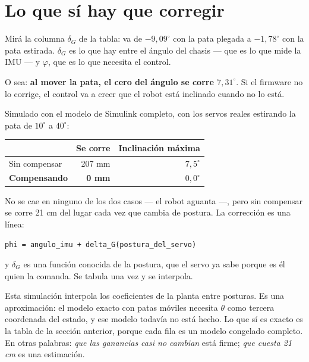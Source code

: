 \documentclass[11pt,a4paper]{report}
\begin{document}
\section{Lo que sí hay que corregir}

\begin{ojo}
Mirá la columna $\delta_G$ de la tabla: va de $-9{,}09^\circ$ con la pata plegada a
$-1{,}78^\circ$ con la pata estirada. $\delta_G$ es lo que hay entre el ángulo del chasis ---
que es lo que mide la IMU --- y $\varphi$, que es lo que necesita el control.

O sea: \textbf{al mover la pata, el cero del ángulo se corre $7{,}31^\circ$}. Si el firmware
no lo corrige, el control va a creer que el robot está inclinado cuando no lo está.
\end{ojo}

Simulado con el modelo de Simulink completo, con los servos reales estirando la pata de
$10^\circ$ a $40^\circ$:

\begin{center}
\begin{tabular}{@{}lrr@{}}
\toprule
& \textbf{Se corre} & \textbf{Inclinación máxima} \\
\midrule
Sin compensar & 207 mm & $7{,}5^\circ$ \\
\textbf{Compensando} & \textbf{0 mm} & \textbf{$0{,}0^\circ$} \\
\bottomrule
\end{tabular}
\end{center}

No se cae en ninguno de los dos casos --- el robot aguanta ---, pero sin compensar se corre
21 cm del lugar cada vez que cambia de postura. La corrección es una línea:

\begin{center}
\texttt{phi = angulo\_imu + delta\_G(postura\_del\_servo)}
\end{center}

y $\delta_G$ es una función conocida de la postura, que el servo ya sabe porque es él quien la
comanda. Se tabula una vez y se interpola.

\begin{ojo}
Esta simulación interpola los coeficientes de la planta entre posturas. Es una aproximación:
el modelo exacto con patas móviles necesita $\theta$ como tercera coordenada del estado, y
ese modelo todavía no está hecho. Lo que sí es exacto es la tabla de la sección anterior,
porque cada fila es un modelo congelado completo. En otras palabras: \emph{que las ganancias
casi no cambian} está firme; \emph{que cuesta 21 cm} es una estimación.
\end{ojo}
\end{document}

